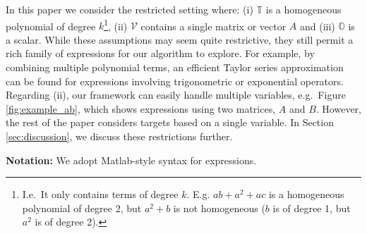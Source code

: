 \documentclass{article} %
\begin{document}
In this paper we consider the restricted setting where: (i)
$\mathbb{T}$ is a homogeneous polynomial of degree $k$\footnote{I.e.~It
  only contains terms of degree $k$. E.g. $ab + a^2 + ac$ is a
  homogeneous polynomial of degree 2, but $a^2 + b$ is not homogeneous
  ($b$ is of degree 1, but $a^2$ is of degree 2).}, (ii) $\mathcal{V}$
contains a single matrix or vector $A$ and (iii) $\mathbb{O}$ is a
scalar. While these assumptions may seem quite restrictive, they still
permit a rich family of expressions for our algorithm to
explore. For example, by combining multiple polynomial terms,
an efficient Taylor series approximation can be found for expressions
involving trigonometric or exponential operators. Regarding (ii), our framework can easily handle multiple
variables, e.g.~Figure \ref{fig:example_ab}, which shows expressions
using two matrices, $A$ and $B$. However, the rest of the paper
considers targets based on a single variable. In Section
\ref{sec:discussion}, we discuss these restrictions further.

{\noindent \bf Notation:} We adopt Matlab-style syntax for expressions.
\end{document}
